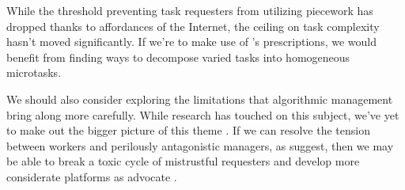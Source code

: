 \documentclass[trackingWork]{subfiles}
\begin{document}
\subsubsubsection{\implication}
While the threshold preventing task requesters from utilizing piecework
has dropped thanks to affordances of the Internet, the ceiling on task complexity hasn't moved significantly.
If we're to make use of \citeauthor{Brown01041990}'s prescriptions,
we would benefit from finding ways to decompose varied tasks into homogeneous microtasks.

We should also consider exploring the limitations that algorithmic management bring along more carefully.
While research has touched on this subject, we've yet to make out the bigger picture of this theme
\cite{uberAlgorithm}.
If we can resolve the tension between workers and perilously antagonistic managers, as \citeauthor{10.2307/2118435} suggest,
then we may be able to break a toxic cycle of mistrustful requesters \cite[for example][]{MaliciousCrowdworkersGadiraju}
and develop more considerate platforms as \citeauthor{takingAHITMcInnis} advocate
\cite{takingAHITMcInnis}.








\onlyinsubfile{
  \balance{}
  \printbibliography
  \nobalance{}
  }
\end{document}
